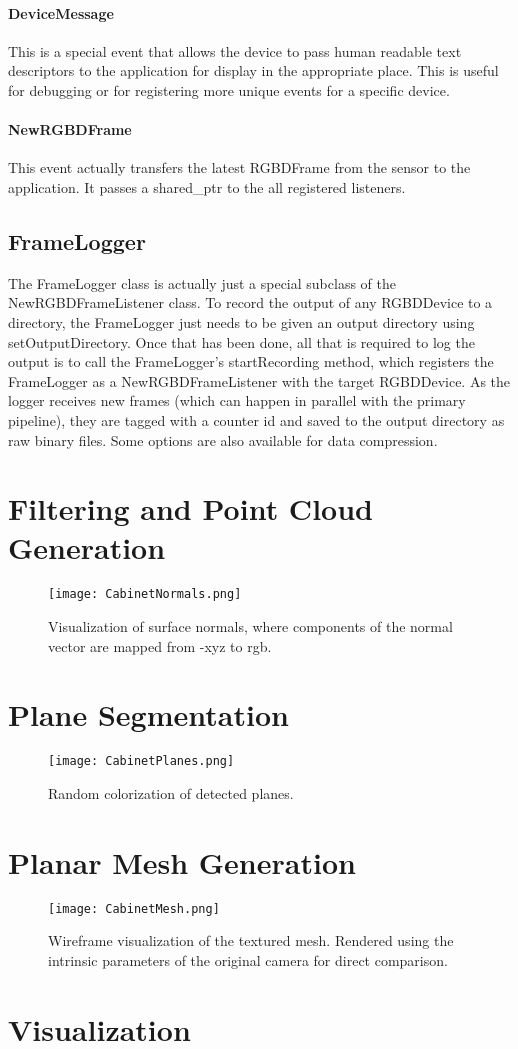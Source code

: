 \paragraph{DeviceMessage}
This is a special event that allows the device to pass human readable text descriptors to the application for display in the appropriate place. This is useful for debugging or for registering more unique events for a specific device.
\paragraph{NewRGBDFrame}
This event actually transfers the latest RGBDFrame from the sensor to the application. It passes a shared\_ptr to the all registered listeners.
\subsection{FrameLogger}
The FrameLogger class is actually just a special subclass of the NewRGBDFrameListener class. To record the output of any RGBDDevice to a directory, the FrameLogger just needs to be given an output directory using setOutputDirectory. Once that has been done, all that is required to log the output is to call the FrameLogger's startRecording method, which registers the FrameLogger as a NewRGBDFrameListener with the target RGBDDevice. As the logger receives new frames (which can happen in parallel with the primary pipeline), they are tagged with a counter id and saved to the output directory as raw binary files. Some options are also available for data compression.
\section{Filtering and Point Cloud Generation}
\begin{figure}[ht]
    \centering
    \texttt{[image: CabinetNormals.png]}
    \caption{Visualization of surface normals, where components of the normal vector are mapped from -xyz to rgb.}
    \label{fig:filteringoutput}
\end{figure}
\section{Plane Segmentation}
\begin{figure}[ht]
    \centering
    \texttt{[image: CabinetPlanes.png]}
    \caption{Random colorization of detected planes.}
    \label{fig:segmentationoutput}
\end{figure}
\section{Planar Mesh Generation}
\begin{figure}[ht]
    \centering
    \texttt{[image: CabinetMesh.png]}
    \caption{Wireframe visualization of the textured mesh. Rendered using the intrinsic parameters of the original camera for direct comparison.}
    \label{fig:meshoutput}
\end{figure}
\section{Visualization}